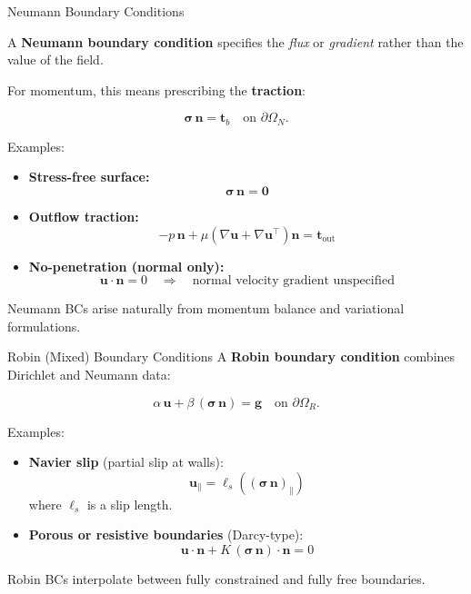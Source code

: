 \documentclass[aspectratio=169]{beamer}
\begin{document}
\begin{frame}{Neumann Boundary Conditions}
\footnotesize

A \textbf{Neumann boundary condition} specifies the \emph{flux} or \emph{gradient}
rather than the value of the field.

For momentum, this means prescribing the \textbf{traction}:

\[
\boldsymbol{\sigma}\,\mathbf{n}
=
\mathbf{t}_b
\quad \text{on } \partial\Omega_N.
\]

Examples:
\begin{itemize}
  \item \textbf{Stress-free surface:}
        \[
        \boldsymbol{\sigma}\,\mathbf{n} = \mathbf{0}
        \]
  \item \textbf{Outflow traction:}
        \[
        -p\,\mathbf{n} + \mu (\nabla\mathbf{u} + \nabla\mathbf{u}^{\!\top})\mathbf{n}
        = \mathbf{t}_{\text{out}}
        \]
  \item \textbf{No-penetration (normal only):}
        \[
        \mathbf{u}\cdot\mathbf{n} = 0
        \quad\Rightarrow\quad
        \text{normal velocity gradient unspecified}
        \]
\end{itemize}

Neumann BCs arise naturally from momentum balance and variational formulations.

\end{frame}

\begin{frame}{Robin (Mixed) Boundary Conditions}
\footnotesize
A \textbf{Robin boundary condition} combines Dirichlet and Neumann data:

\[
\alpha\,\mathbf{u}
+
\beta\,(\boldsymbol{\sigma}\,\mathbf{n})
=
\mathbf{g}
\quad \text{on } \partial\Omega_R.
\]

Examples:
\begin{itemize}
  \item \textbf{Navier slip} (partial slip at walls):
        \[
        \mathbf{u}_\parallel
        =
        \ell_s \left(
        (\boldsymbol{\sigma}\,\mathbf{n})_\parallel
        \right)
        \]
        where $\ell_s$ is a slip length.
  \item \textbf{Porous or resistive boundaries} (Darcy-type):
        \[
        \mathbf{u}\cdot\mathbf{n}
        +
        K\,(\boldsymbol{\sigma}\,\mathbf{n})\cdot\mathbf{n}
        =
        0
        \]
\end{itemize}

Robin BCs interpolate between fully constrained and fully free boundaries.


\end{frame}
\end{document}
